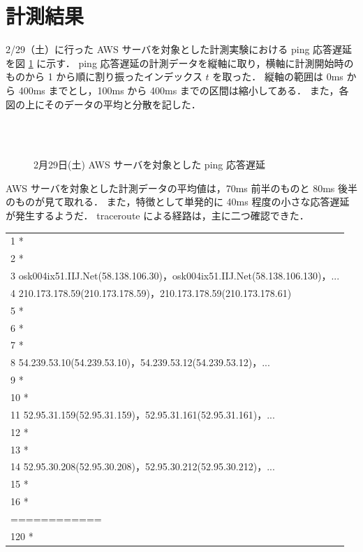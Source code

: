 \documentclass[a4j]{jarticle}
\begin{document}
\section{計測結果}
 2/29（土）に行った AWS サーバを対象とした計測実験における ping 応答遅延を図 \ref{data} に示す．
ping 応答遅延の計測データを縦軸に取り，横軸に計測開始時のものから 1 から順に割り振ったインデックス $t$ を取った．
縦軸の範囲は 0ms から 400ms までとし，100ms から 400ms までの区間は縮小してある．
また，各図の上にそのデータの平均と分散を記した．

\begin{figure}[H]
\begin{center}
~
~
\\
~
\caption{2月29日(土) AWS サーバを対象とした ping 応答遅延}
\label{data}
\end{center}
\end{figure}
 
AWS サーバを対象とした計測データの平均値は，70ms 前半のものと 80ms 後半のものが見て取れる．
また，特徴として単発的に 40ms 程度の小さな応答遅延が発生するようだ．
traceroute による経路は，主に二つ確認できた．
\begin{table}[H]
\begin{tabular}{l}
 1  *\\
 2  *\\
 3  osk004ix51.IIJ.Net(58.138.106.30)，osk004ix51.IIJ.Net(58.138.106.130)，...\\
 4  210.173.178.59(210.173.178.59)，210.173.178.59(210.173.178.61)\\
 5  *\\
 6  *\\
 7  *\\
 8  54.239.53.10(54.239.53.10)，54.239.53.12(54.239.53.12)，...\\
 9  *\\
10  *\\
11  52.95.31.159(52.95.31.159)，52.95.31.161(52.95.31.161)，...\\
12  *\\
13  *\\
14  52.95.30.208(52.95.30.208)，52.95.30.212(52.95.30.212)，...\\
15  *\\
16  *\\
============\\
120 *\\
\end{tabular}
\end{table}
\end{document}

